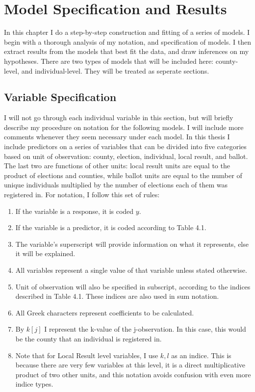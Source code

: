 \documentclass[12pt,twoside]{reedthesis}
\providecommand{\tightlist}{%
  \setlength{\itemsep}{0pt}\setlength{\parskip}{0pt}}
\begin{document}
  \chapter{Model Specification and
  Results}\label{model-specification-and-results}
  
  In this chapter I do a step-by-step construction and fitting of a series
  of models. I begin with a thorough analysis of my notation, and
  specification of models. I then extract results from the models that
  best fit the data, and draw inferences on my hypotheses. There are two
  types of models that will be included here: county-level, and
  individual-level. They will be treated as seperate sections.
  
  \section{Variable Specification}\label{variable-specification}
  
  I will not go through each individual variable in this section, but will
  briefly describe my procedure on notation for the following models. I
  will include more comments whenever they seem necessary under each
  model. In this thesis I include predictors on a series of variables that
  can be divided into five categories based on unit of observation:
  county, election, individual, local result, and ballot. The last two are
  functions of other units: local result units are equal to the product of
  elections and counties, while ballot units are equal to the number of
  unique individuals multiplied by the number of elections each of them
  was registered in. For notation, I follow this set of rules:
  
  \begin{enumerate}
  \def\labelenumi{\arabic{enumi}.}
  \tightlist
  \item
    If the variable is a response, it is coded \(y\).
  \item
    If the variable is a predictor, it is coded according to Table 4.1.
  \item
    The variable's superscript will provide information on what it
    represents, else it will be explained.
  \item
    All variables represent a single value of that variable unless stated
    otherwise.
  \item
    Unit of observation will also be specified in subscript, according to
    the indices described in Table 4.1. These indices are also used in sum
    notation.
  \item
    All Greek characters represent coefficients to be calculated.
  \item
    By \(k[j]\) I represent the k-value of the j-observation. In this
    case, this would be the county that an individual is registered in.
  \item
    Note that for Local Result level variables, I use \(k,l\) as an
    indice. This is because there are very few variables at this level, it
    is a direct multiplicative product of two other units, and this
    notation avoids confusion with even more indice types.
  \end{enumerate}
  
\end{document}
